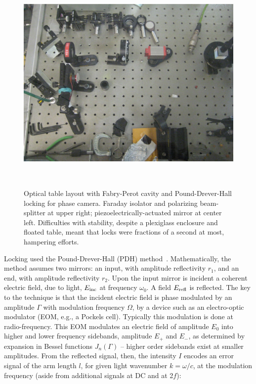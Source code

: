 \begin{figure}
\begin{center}
\includegraphics[height=111mm, width=148mm]{Optical_table_phase_camera.eps}
\caption{Optical table layout with Fabry-Perot cavity and Pound-Drever-Hall locking for phase camera. Faraday isolator and polarizing beam-splitter at upper right; piezoelectrically-actuated mirror at center left. Difficulties with stability, despite a plexiglass enclosure and floated table, meant that locks were fractions of a second at most, hampering efforts.}
\label{phase_camera_optical_table}
\end{center}
\end{figure}

Locking used the Pound-Drever-Hall (PDH) method~\cite{PDHNotes,MavalvalaThesis}.
Mathematically, the method assumes two mirrors: an input, with amplitude reflectivity $r_1$, and an end, with amplitude reflectivity $r_2$.
Upon the input mirror is incident a coherent electric field, due to light, $E_\textup{inc}$ at frequency $\omega_0$. A field $E_{\textup{refl}}$ is reflected.
The key to the technique is that the incident electric field is phase modulated by an amplitude $\Gamma$ with modulation frequency $\Omega$, by a device such as an electro-optic modulator (EOM, e.g., a Pockels cell).
Typically this modulation is done at radio-frequency.
This EOM modulates an electric field of amplitude $E_0$ into higher and lower frequency sidebands, amplitude $E_+$ and $E_-$, as determined by expansion in Bessel functions $J_n(\Gamma)$ -- higher order sidebands exist at smaller amplitudes.
From the reflected signal, then, the intensity $I$ encodes an error signal of the arm length $l$, for given light wavenumber $k = \omega / c$, at the modulation frequency (aside from additional signals at DC and at 2$f$):


